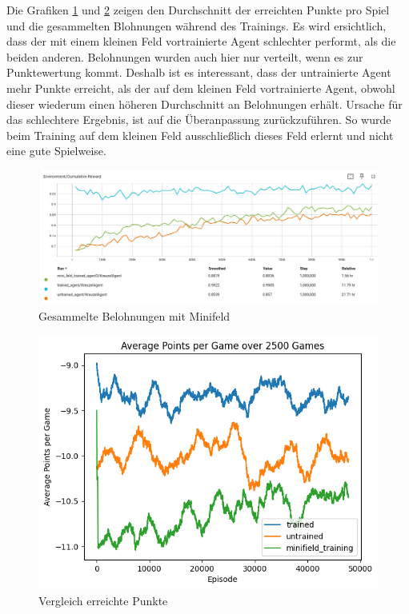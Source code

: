 

Die Grafiken \ref{fig:Minifeld_rewards} und \ref{fig:Minifeld_points} zeigen den Durchschnitt der erreichten Punkte pro Spiel und die gesammelten Blohnungen während des Trainings.
Es wird ersichtlich, dass der mit einem kleinen Feld vortrainierte Agent schlechter performt, als die beiden anderen. Belohnungen wurden auch hier nur verteilt, wenn es zur Punktewertung kommt. Deshalb ist es interessant, dass der untrainierte Agent mehr Punkte erreicht, als der auf dem kleinen Feld vortrainierte Agent, obwohl dieser wiederum einen höheren Durchschnitt an Belohnungen erhält. Ursache für das schlechtere Ergebnis, ist auf die Überanpassung zurückzuführen. So wurde beim Training auf dem kleinen Feld ausschließlich dieses Feld erlernt und nicht eine gute Spielweise. 


\begin{figure}[!h]
    \centering
    \includegraphics[scale=0.3]{Bilder/rewards_minifield.png}
    \caption{Gesammelte Belohnungen mit Minifeld}
    \label{fig:Minifeld_rewards}
\end{figure}

\begin{figure}[!h]
    \centering
    \includegraphics[scale=0.5]{Bilder/points_minifeld.png}
    \caption{Vergleich erreichte Punkte}
    \label{fig:Minifeld_points}
\end{figure}


